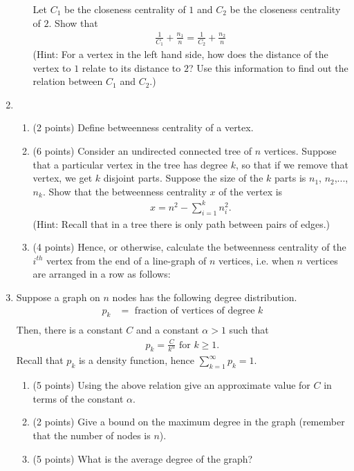 \documentclass[a4paper,10pt]{article}
\begin{document}
\begin{enumerate}
\begin{enumerate}
Let $C_1$ be the closeness
centrality of $1$ and $C_2$ be the closeness centrality of $2$. Show that
\begin{align*}
\frac{1}{C_1} + \frac{n_1}{n} = \frac{1}{C_2} + \frac{n_2}{n}
\end{align*}
(Hint: For a vertex in the left hand side, how does the distance of the vertex to $1$ relate to its distance to $2$? 
Use this information to find out the relation between $C_1$ and $C_2$.) 

\end{enumerate}

\item 
\begin{enumerate}
\item (2 points) Define betweenness centrality of a vertex. 
\item (6 points) Consider an undirected connected tree of $n$ vertices. 
Suppose that a particular vertex in the tree has degree $k$, so that if we remove that vertex, we get $k$ disjoint parts.
Suppose the size of the $k$ parts is $n_1$, $n_2$,...,$n_k$. Show that the betweenness centrality $x$ of the vertex
is 
\begin{align*}
 x = n^2 - \sum_{i=1}^k n_i^2.
\end{align*}
(Hint: Recall that in a tree there is only path between pairs of edges.)
\item (4 points) Hence, or otherwise, calculate the betweenness centrality of the $i^{th}$ vertex from the end of a line-graph
of $n$ vertices, i.e. when $n$ vertices are arranged in a row as follows:
\vspace*{1.5in}
\end{enumerate}


\item Suppose a graph on $n$ nodes has the following degree distribution. 
\begin{align*}
 p_k &= \mbox{ fraction of vertices of degree } k\\
\end{align*}
Then, there is a constant $C$ and a constant $\alpha> 1$ such that
\begin{align*}
 p_k = \frac{C}{k^\alpha} \mbox{ for } k \ge 1.
\end{align*}
Recall that $p_k$ is a density function, hence $\sum_{k=1}^{\infty} p_k = 1$. 
\begin{enumerate}
\item (5 points) Using the above relation give an approximate value for $C$ in terms of the constant $\alpha$.
\item (2 points) Give a bound on the maximum degree in the graph (remember that the number of nodes is $n$).
\item (5 points) What is the average degree of the graph?
\end{enumerate}


\end{enumerate}
\end{document}
